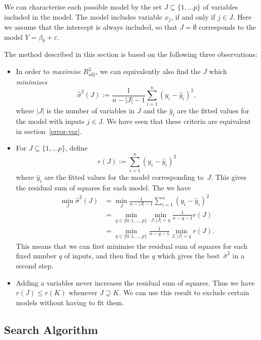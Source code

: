 \documentclass[
  a4paper,
]{article}
\theoremstyle{definition}
\theoremstyle{definition}
\theoremstyle{definition}
\theoremstyle{definition}
\theoremstyle{remark}
\begin{document}
We can characterise each possible model by the set \(J \subseteq \{1, \ldots
p\}\) of variables included in the model. The model includes variable \(x_j\), if
and only if \(j \in J\). Here we assume that the intercept is always included,
so that \(J=\emptyset\) corresponds to the model \(Y = \beta_0 + \varepsilon\).

The method described in this section is based on the following three observations:

\begin{itemize}
\item
  In order to \emph{maximise} \(R^2_\mathrm{adj}\), we can equivalently also
  find the \(J\) which \emph{minimises}
  \begin{equation*}
    \hat\sigma^2(J)
      := \frac{1}{n - |J| - 1} \sum_{i=1}^n (y_i - \hat y_i)^2,
  \end{equation*}
  where \(|J|\) is the number of variables in \(J\) and the
  \(\hat y_i\) are the fitted values for the model with inputs \(j \in J\).
  We have seen that these criteria are equivalent in section~\ref{error-var}.
\item
  For \(J \subseteq \{1, \ldots p\}\), define
  \begin{equation*}
    r(J)
      := \sum_{i=1}^n (y_i - \hat y_i)^2
  \end{equation*}
  where \(\hat y_i\) are the fitted values for the model corresponding to~\(J\).
  This gives the residual sum of squares for each model. The we have
  \begin{align*}
    \min_J \hat\sigma^2(J)
      &= \min_J \frac{1}{n - |J| - 1} \sum_{i=1}^n (y_i - \hat y_i)^2 \\
      &= \min_{q \in \{0, 1, \ldots, p\}} \min_{J, |J|=q} \frac{1}{n - q - 1} r(J) \\
      &= \min_{q \in \{0, 1, \ldots, p\}} \frac{1}{n - q - 1} \min_{J, |J|=q} r(J).
  \end{align*}
  This means that we can first minimise the residual sum of squares
  for each fixed number \(q\) of inputs, and then find the \(q\)
  which gives the best~\(\hat\sigma^2\) in a second step.
\item
  Adding a variables never increases the residual sum of squares.
  Thus we have \(r(J) \leq r(K)\) whenever \(J \supseteq K\).
  We can use this result to exclude certain models without having to fit them.
\end{itemize}

\subsection{Search Algorithm}\label{search-algorithm}
\end{document}
